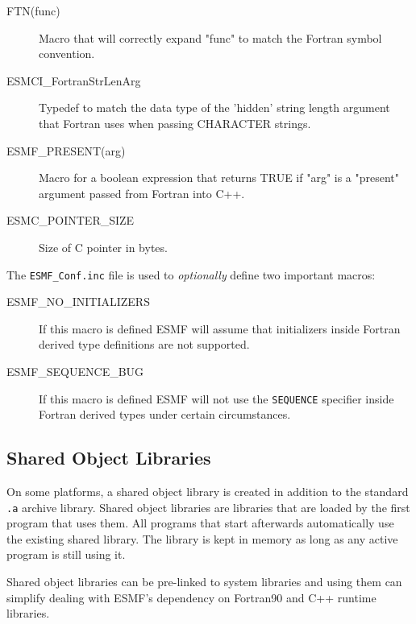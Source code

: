 \begin{description}

\item[FTN(func)]
Macro that will correctly expand "func" to match the Fortran symbol convention.

\item[ESMCI\_FortranStrLenArg]
Typedef to match the data type of the 'hidden' string length argument that
Fortran uses when passing CHARACTER strings.

\item[ESMF\_PRESENT(arg)]
Macro for a boolean expression that returns TRUE if "arg" is a "present"
argument passed from Fortran into C++.

\item[ESMC\_POINTER\_SIZE]
Size of C pointer in bytes.

\end{description}


The {\tt ESMF\_Conf.inc} file is used to {\em optionally} define two 
important macros:

\begin{description}

\item[ESMF\_NO\_INITIALIZERS]
If this macro is defined ESMF will assume that initializers inside 
Fortran derived type definitions are not supported.

\item[ESMF\_SEQUENCE\_BUG]
If this macro is defined ESMF will not use the {\tt SEQUENCE} specifier
inside Fortran derived types under certain circumstances.

\end{description}


\subsection{Shared Object Libraries}

On some platforms, a shared object library is created in addition to the
standard {\tt .a} archive library.
Shared object libraries are libraries that are loaded by the first program 
that uses them. All programs that start afterwards automatically use the 
existing shared library. The library is kept in memory as long as any 
active program is still using it. 

Shared object libraries can be pre-linked to system libraries and using them
can simplify dealing with ESMF's dependency on Fortran90 and C++ runtime 
libraries. 

